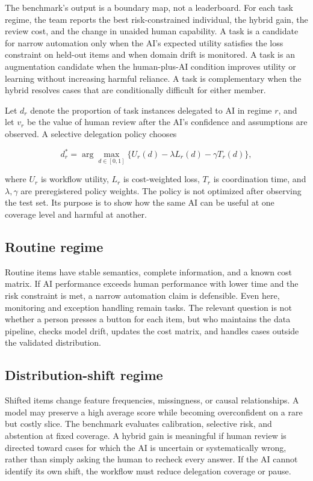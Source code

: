\documentclass[conference]{IEEEtran}
\begin{document}
The benchmark's output is a boundary map, not a leaderboard. For each task regime, the team reports the best risk-constrained individual, the hybrid gain, the review cost, and the change in unaided human capability. A task is a candidate for narrow automation only when the AI's expected utility satisfies the loss constraint on held-out items and when domain drift is monitored. A task is an augmentation candidate when the human-plus-AI condition improves utility or learning without increasing harmful reliance. A task is complementary when the hybrid resolves cases that are conditionally difficult for either member.

Let $d_r$ denote the proportion of task instances delegated to AI in regime $r$, and let $v_r$ be the value of human review after the AI's confidence and assumptions are observed. A selective delegation policy chooses

\begin{equation}
d_r^*=\arg\max_{d\in[0,1]}\{U_r(d)-\lambda L_r(d)-\gamma T_r(d)\},
\end{equation}

where $U_r$ is workflow utility, $L_r$ is cost-weighted loss, $T_r$ is coordination time, and $\lambda,\gamma$ are preregistered policy weights. The policy is not optimized after observing the test set. Its purpose is to show how the same AI can be useful at one coverage level and harmful at another.

\subsection{Routine regime}

Routine items have stable semantics, complete information, and a known cost matrix. If AI performance exceeds human performance with lower time and the risk constraint is met, a narrow automation claim is defensible. Even here, monitoring and exception handling remain tasks. The relevant question is not whether a person presses a button for each item, but who maintains the data pipeline, checks model drift, updates the cost matrix, and handles cases outside the validated distribution.

\subsection{Distribution-shift regime}

Shifted items change feature frequencies, missingness, or causal relationships. A model may preserve a high average score while becoming overconfident on a rare but costly slice. The benchmark evaluates calibration, selective risk, and abstention at fixed coverage. A hybrid gain is meaningful if human review is directed toward cases for which the AI is uncertain or systematically wrong, rather than simply asking the human to recheck every answer. If the AI cannot identify its own shift, the workflow must reduce delegation coverage or pause.
\end{document}

